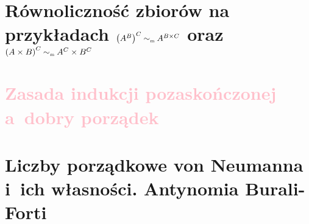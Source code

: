 \section{Równoliczność zbiorów na przykładach \texorpdfstring{\(\left(A^B\right)^C \mathbin{\sim_{\mathrm{\scriptscriptstyle m}}} A^{B \times C}\)}{(A\^B)\^C ~ A\^(B x C)} oraz \texorpdfstring{\(\left(A \times B\right)^C \mathbin{\sim_{\mathrm{\scriptscriptstyle m}}} A^C \times B^C\)}{(A x B)\^C ~ A\^C x B\^C}}
\label{mfi:equinumerosity}


\section{\textcolor{pink}{Zasada indukcji pozaskończonej a~dobry porządek}}


\section{Liczby porządkowe von Neumanna i~ich własności. Antynomia Burali-Forti}
